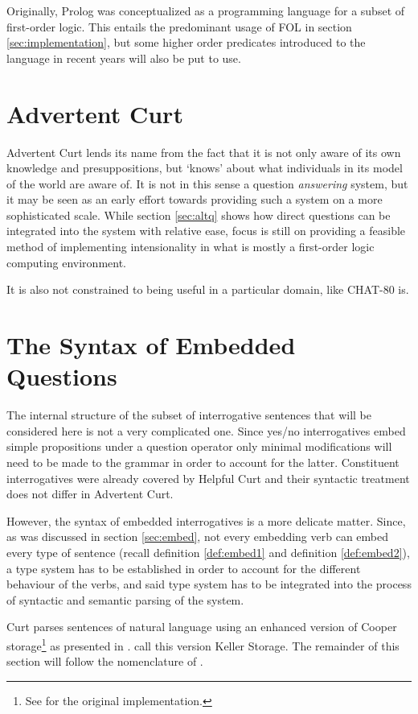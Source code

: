 \documentclass[notitlepage,twoside,a4paper]{scrreprt}
\newcommand{\abbr}{\textsf} %
\newcommand{\pn}{\textsf} %
\newcommand{\curt}{\pn{Curt}}
\newcommand{\acurt}{\pn{Advertent Curt}}
\newcommand{\prol}{\pn{Prolog}}
\theoremstyle{remark}
\theoremstyle{remark}
\theoremstyle{definition}
\theoremstyle{definition}
\begin{document}
Originally, \prol{} was conceptualized as a programming language for a subset of
first-order logic. This entails the predominant usage of \abbr{FOL} in section
\ref{sec:implementation}, but some higher order predicates introduced to the
language in recent years will also be put to use.

\section{Advertent Curt}

\acurt{} lends its name from the fact that it is not only aware of its own
knowledge and presuppositions, but `knows' about what individuals in its
model of the world are aware of. It is not in this sense a question
\emph{answering} system, but it may be seen as an early effort towards providing
such a system on a more sophisticated scale. While section \ref{sec:altq} shows
how direct questions can be integrated into the system with relative ease, focus
is still on providing a feasible method of implementing intensionality in what
is mostly a first-order logic computing environment.


It is also not constrained to being useful in a particular domain, like
\pn{CHAT-80} is.

\section{The Syntax of Embedded Questions}

The internal structure of the subset of interrogative sentences that will be
considered here is not a very complicated one. Since yes/no interrogatives  embed
simple propositions under a question operator only minimal modifications will
need to be made to the grammar in order to account for the latter. Constituent
interrogatives were already covered by \pn{Helpful Curt} and their syntactic
treatment does not differ in \acurt{}.

However, the syntax of embedded interrogatives is a more delicate matter. Since,
as was discussed in section \ref{sec:embed}, not every embedding verb can embed
every type of sentence (recall definition \ref{def:embed1} and definition
\ref{def:embed2}), a type system has to be established in order to account for
the different behaviour of the verbs, and said type system has to be integrated
into the process of syntactic and semantic parsing of the system.

\curt{} parses sentences of natural language using an enhanced version of \pn{Cooper
storage}\footnote{See \cite{cooper:storage2} for the original implementation.} as
presented in \cite{keller:storage}. \cite{blackburnbos:cl1} call this version
\pn{Keller Storage}. The remainder of this section will follow the nomenclature
of \cite{blackburnbos:cl1}. 
\end{document}
